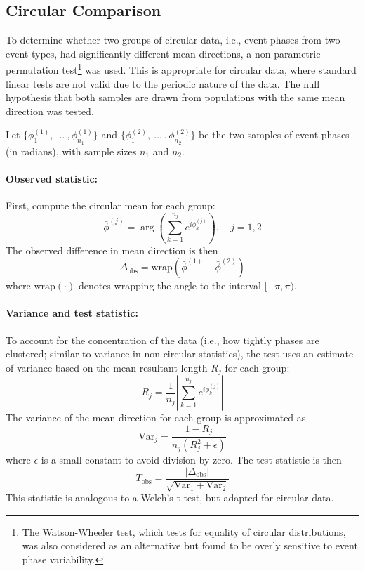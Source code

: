 \subsection{Circular Comparison} \label{subsec:circular-comparison}
To determine whether two groups of circular data, i.e., event phases from two event types, had significantly different mean directions, a non-parametric permutation test\footnote{The Watson-Wheeler test, which tests for equality of circular distributions, was also considered as an alternative but found to be overly sensitive to event phase variability.} was used.
This is appropriate for circular data, where standard linear tests are not valid due to the periodic nature of the data.
The null hypothesis that both samples are drawn from populations with the same mean direction was tested.

Let $\{\phi_1^{(1)},\ \ldots\ , \phi_{n_1}^{(1)}\}$ and $\{\phi_1^{(2)},\ \ldots\ , \phi_{n_2}^{(2)}\}$ be the two samples of event phases (in radians), with sample sizes $n_1$ and $n_2$.

\paragraph{Observed statistic:}
First, compute the circular mean for each group:
\begin{equation} \label{eq:circ-mean}
    \bar{\phi}^{(j)} = \arg\left( \sum_{k=1}^{n_j} e^{i \phi_k^{(j)}} \right), \quad j=1,2
\end{equation}
The observed difference in mean direction is then
\begin{equation} \label{eq:delta-obs}
    \Delta_{\text{obs}} = \mathrm{wrap}(\bar{\phi}^{(1)} - \bar{\phi}^{(2)})
\end{equation}
where $\mathrm{wrap}(\cdot)$ denotes wrapping the angle to the interval $[-\pi, \pi)$.

\paragraph{Variance and test statistic:}
To account for the concentration of the data (i.e., how tightly phases are clustered; similar to variance in non-circular statistics), the test uses an estimate of variance based on the mean resultant length $R_j$ for each group:
\begin{equation} \label{eq:mean-resultant-length}
    R_j = \frac{1}{n_j} \left| \sum_{k=1}^{n_j} e^{i \phi_k^{(j)}} \right|
\end{equation}
The variance of the mean direction for each group is approximated as
\begin{equation} \label{eq:var-mean-dir}
    \mathrm{Var}_j = \frac{1 - R_j}{n_j (R_j^2 + \epsilon)}
\end{equation}
where $\epsilon$ is a small constant to avoid division by zero.
The test statistic is then
\begin{equation} \label{eq:circ-tstat}
    T_{\text{obs}} = \frac{|\Delta_{\text{obs}}|}{\sqrt{\mathrm{Var}_1 + \mathrm{Var}_2}}
\end{equation}
This statistic is analogous to a Welch's t-test, but adapted for circular data.

